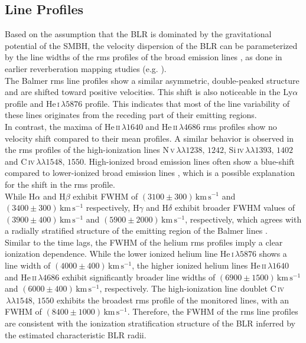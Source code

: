 \subsection{Line Profiles}
Based on the assumption that the BLR is dominated by the gravitational potential of the SMBH, the velocity dispersion of the BLR can be parameterized by the line widths of the rms profiles of the broad emission lines \parencite{peterson2004}, as done in earlier reverberation mapping studies (e.g. \cite{kollatschny1997balmer, denney2006ngc4593}).\\
The Balmer rms line profiles show a similar asymmetric, double-peaked structure and are shifted toward positive velocities. This shift is also noticeable in the Ly$\alpha$ profile and He\,\textsc{i}$\,\lambda5876$ profile. This indicates that most of the line variability of these lines originates from the receding part of their emitting regions.\\
In contrast, the maxima of He\,\textsc{ii}$\,\lambda1640$ and He\,\textsc{ii}$\,\lambda4686$ rms profiles show no velocity shift compared to their mean profiles. A similar behavior is observed in the rms profiles of the high-ionization lines N\,\textsc{v}$\,\lambda\lambda 1238,\,1242$, Si\,\textsc{iv}$\,\lambda\lambda 1393,\,1402$ and C\,\textsc{iv}$\,\lambda\lambda 1548,\,1550$. High-ionized broad emission lines often show a blue-shift compared to lower-ionized broad emission lines \parencite{gaskell1982redshift}, which is a possible explanation for the shift in the rms profile. \\
While H$\alpha$ and H$\beta$ exhibit FWHM of $(3100\pm 300)\,\mathrm{km\,s^{-1}}$ and $(3400 \pm 300)\,\mathrm{km\,s^{-1}}$ respectively, H$\gamma$ and H$\delta$ exhibit broader FWHM values of $(3900 \pm 400)\,\mathrm{km\,s^{-1}}$ and $(5900 \pm 2000)\,\mathrm{km\,s^{-1}}$, respectively, which agrees with a radially stratified structure of the emitting region of the Balmer lines \parencite{korista2004optical}. \\
Similar to the time lags, the FWHM of the helium rms profiles imply a clear ionization dependence. While the lower ionized helium line He\,\textsc{i}\,$\lambda5876$ shows a line width of $(4000 \pm 400)\,\mathrm{km\,s^{-1}}$, the higher ionized helium lines He\,\textsc{ii}\,$\lambda1640$ and He\,\textsc{ii}\,$\lambda4686$ exhibit significantly broader line widths of $(6900 \pm 1500)\,\mathrm{km\,s^{-1}}$ and $(6000 \pm 400)\,\mathrm{km\,s^{-1}}$, respectively. The high-ionization line doublet C\,\textsc{iv}$\,\lambda\lambda 1548,\,1550$ exhibits the broadest rms profile of the monitored lines, with an FWHM of $(8400 \pm 1000)\,\mathrm{km\,s^{-1}}$. Therefore, the FWHM of the rms line profiles are consistent with the ionization stratification structure of the BLR inferred by the estimated characteristic BLR radii. 


